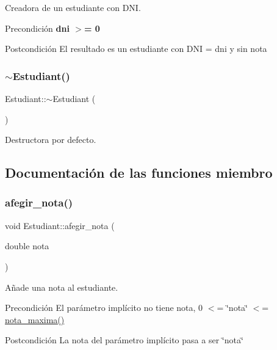 Creadora de un estudiante con D\+NI. 

\begin{DoxyPrecond}{Precondición}
{\bfseries dni $>$= 0} 
\end{DoxyPrecond}
\begin{DoxyPostcond}{Postcondición}
El resultado es un estudiante con D\+NI = dni y sin nota 
\end{DoxyPostcond}
\mbox{\label{class_estudiant_a2e2bd22924dacfe16acf12b5c31efd01}} 
\subsubsection{\texorpdfstring{$\sim$\+Estudiant()}{~Estudiant()}}
{\footnotesize\ttfamily Estudiant\+::$\sim$\+Estudiant (\begin{DoxyParamCaption}{ }\end{DoxyParamCaption})}



Destructora por defecto. 



\subsection{Documentación de las funciones miembro}
\mbox{\label{class_estudiant_a8a2186560dce4ccfc5922d2c98f21305}} 
\subsubsection{\texorpdfstring{afegir\+\_\+nota()}{afegir\_nota()}}
{\footnotesize\ttfamily void Estudiant\+::afegir\+\_\+nota (\begin{DoxyParamCaption}\item[{double}]{nota }\end{DoxyParamCaption})}



Añade una nota al estudiante. 

\begin{DoxyPrecond}{Precondición}
El parámetro implícito no tiene nota, 0 $<$= \char`\"{}nota\char`\"{} $<$= \hyperlink{class_estudiant_a5df5eed414c87a2a1c2efa4194633afd}{nota\+\_\+maxima()} 
\end{DoxyPrecond}
\begin{DoxyPostcond}{Postcondición}
La nota del parámetro implícito pasa a ser \char`\"{}nota\char`\"{} 
\end{DoxyPostcond}
\mbox{\label{class_estudiant_a5d5eded678c16a864f22477d401a56af}} 

